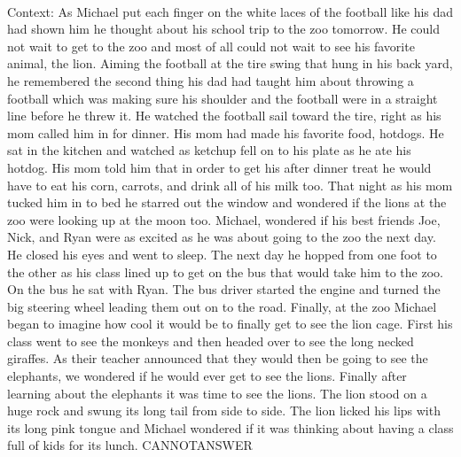 \documentclass[11pt,a4paper, onecolumn]{article}
\begin{document}
\\ Context: As Michael put each finger on the white laces of the football like his dad had shown him he thought about his school trip to the zoo tomorrow. He could not wait to get to the zoo and most of all could not wait to see his favorite animal, the lion. Aiming the football at the tire swing that hung in his back yard, he remembered the second thing his dad had taught him about throwing a football which was making sure his shoulder and the football were in a straight line before he threw it. He watched the football sail toward the tire, right as his mom called him in for dinner. His mom had made his favorite food, hotdogs. He sat in the kitchen and watched as ketchup fell on to his plate as he ate his hotdog. His mom told him that in order to get his after dinner treat he would have to eat his corn, carrots, and drink all of his milk too. That night as his mom tucked him in to bed he starred out the window and wondered if the lions at the zoo were looking up at the moon too. Michael, wondered if his best friends Joe, Nick, and Ryan were as excited as he was about going to the zoo the next day. He closed his eyes and went to sleep. The next day he hopped from one foot to the other as his class lined up to get on the bus that would take him to the zoo. On the bus he sat with Ryan. The bus driver started the engine and turned the big steering wheel leading them out on to the road. Finally, at the zoo Michael began to imagine how cool it would be to finally get to see the lion cage. First his class went to see the monkeys and then headed over to see the long necked giraffes. As their teacher announced that they would then be going to see the elephants, we wondered if he would ever get to see the lions. Finally after learning about the elephants it was time to see the lions. The lion stood on a huge rock and swung its long tail from side to side. The lion licked his lips with its long pink tongue and Michael wondered if it was thinking about having a class full of kids for its lunch. CANNOTANSWER
\end{document}
